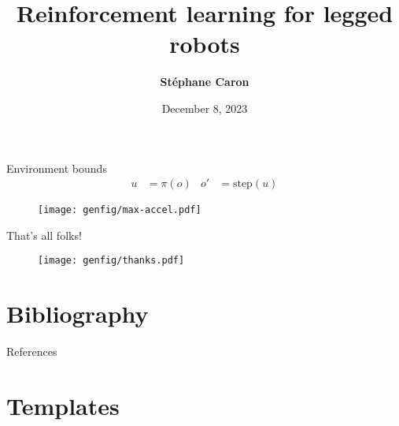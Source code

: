 \documentclass[9pt, aspectratio=43]{beamer}
\title{
    Reinforcement learning for legged robots
}
\author{\textbf{St\'ephane Caron}}
\date{December 8, 2023}
\institute{Inria--\'{E}cole normale sup\'{e}rieure}
\begin{document}
\maketitle


\begin{frame}{Environment bounds}
    \begin{align*}
        u & = \pi(o) & o' & = \mathrm{step}(u)
    \end{align*}
    \begin{figure}
        \texttt{[image: genfig/max-accel.pdf]}
    \end{figure}
\end{frame}

\begin{frame}{That's all folks!}
    \vspace{2em}
    \begin{figure}
        \centering
        \texttt{[image: genfig/thanks.pdf]}
    \end{figure}
\end{frame}


\section*{Bibliography}

\renewcommand*{\bibfont}{\footnotesize}
\begin{frame}[allowframebreaks]{References}
    \printbibliography[heading=none]
\end{frame}

\section*{Templates}
\end{document}
